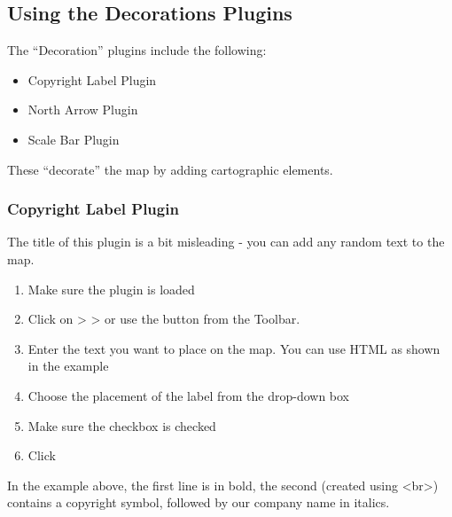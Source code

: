 \subsection{Using the Decorations Plugins}

The ``Decoration'' plugins include the following:

\begin{itemize}
\item Copyright Label Plugin
\item North Arrow Plugin
\item Scale Bar Plugin
\end{itemize}
 
These ``decorate'' the map by adding cartographic elements. 

\subsubsection{Copyright Label Plugin}


The title of this plugin is a bit misleading - you can add any random text to the map.

\begin{enumerate}
\item Make sure the plugin is loaded
\item Click on  >  >  or use the  button from the Toolbar.
\item Enter the text you want to place on the map. You can use HTML as
  shown in the example
\item Choose the placement of the label from the  drop-down box
\item Make sure the  checkbox is checked
\item Click  
\end{enumerate}

In the example above, the first line is in bold, the second (created using
\textless br\textgreater) contains a copyright symbol, followed by our company name in
italics.

